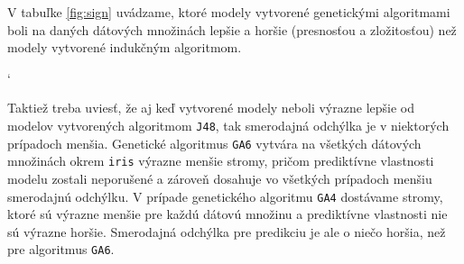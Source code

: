 V tabuľke \ref{fig:sign} uvádzame, ktoré modely vytvorené genetickými algoritmami boli na daných dátových množinách lepšie a horšie (presnosťou a zložitosťou) než modely vytvorené indukčným algoritmom.

\begin{table}[h]
\catcode`
\centering
{}
\caption{Tabuľka, v ktorej popisujeme, ktoré výsledky boli signifikantne lepšie od tých získaných algoritmom \texttt{J48}. }\label{fig:sign}
\end{table}

Taktiež treba uviesť, že aj keď vytvorené modely neboli výrazne lepšie od modelov vytvorených algoritmom \verb|J48|, tak smerodajná odchýlka je v niektorých prípadoch menšia.
Genetické algoritmus \verb|GA6| vytvára na všetkých dátových množinách okrem \verb|iris| výrazne menšie stromy, pričom prediktívne vlastnosti modelu zostali neporušené a zároveň dosahuje vo všetkých prípadoch menšiu smerodajnú odchýlku. V prípade genetického algoritmu \verb|GA4| dostávame stromy, ktoré sú výrazne menšie pre každú dátovú množinu a prediktívne vlastnosti nie sú výrazne horšie. Smerodajná odchýlka pre predikciu je ale o niečo horšia, než pre algoritmus \verb|GA6|.

